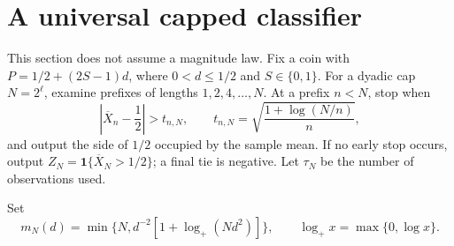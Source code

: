 \documentclass[11pt,a4paper]{article}
\theoremstyle{definition}
\newcommand{\ind}{\mathbf 1}
\newcommand{\logp}{\log_+}
\begin{document}
\section{A universal capped classifier}\label{sec:classifier}
This section does not assume a magnitude law. Fix a coin with
$P=1/2+(2S-1)d$, where $0<d\le1/2$ and $S\in\{0,1\}$.
For a dyadic cap $N=2^\ell$, examine prefixes of lengths $1,2,4,\ldots,N$.
At a prefix $n<N$, stop when
\begin{equation}\label{eq:threshold}
 \left|\overline X_n-\frac12\right|>t_{n,N},\qquad
 t_{n,N}=\sqrt{\frac{1+\log(N/n)}{n}},
\end{equation}
and output the side of $1/2$ occupied by the sample mean. If no early stop
occurs, output $Z_N=\ind\{\overline X_N>1/2\}$; a final tie is negative.
Let $\tau_N$ be the number of observations used.

Set
\begin{equation}\label{eq:m-definition}
 m_N(d)=\min\{N,d^{-2}[1+\logp(Nd^2)]\},\qquad
 \logp x=\max\{0,\log x\}.
\end{equation}
\end{document}
